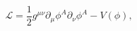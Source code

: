 \begin{equation}
{\mathcal{L}} = \frac{1}{2}g^{\mu \nu }\partial _\mu \phi
^A\partial _\nu \phi ^A-V(\phi ), \label{lag}
\end{equation}

